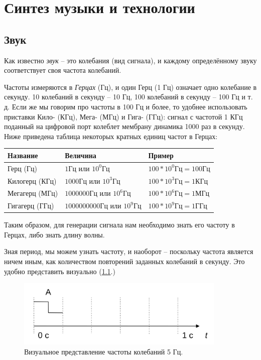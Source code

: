 \documentclass[a4paper,twoside]{book}
\begin{document}
\chapter{Синтез музыки и технологии}

\section{Звук}

Как известно \emph{звук} -- это колебания (вид сигнала), и каждому определённому
звуку соответствует своя частота колебаний.

Частоты измеряются в \emph{Герцах} (Гц), и один Герц (1 Гц) означает одно
колебание в секунду. 10 колебаний в секунду -- 10 Гц, 100 колебаний в секунду --
100 Гц и т. д. Если же мы говорим про частоты в 100 Гц и более, то удобнее
использовать приставки Кило- (КГц), Мега- (МГц) и Гига- (ГГц): сигнал с частотой
1 КГц поданный на цифровой порт колеблет мембрану динамика 1000 раз в секунду.
Ниже приведена таблица некоторых кратных единиц частот в Герцах:

\begin{tabular}{p{3cm}|p{4cm}|p{3.5cm}}
  Название & Величина & Пример \\
  \hline \hline
  Герц (Гц)
  & $ 1 \mbox{Гц} $ или $ 10^0 \mbox{Гц} $
  & $ 100 * 10^0 \mbox{Гц} = 100 \mbox{Гц} $ \\
  \hline
  Килогерц (КГц)
  & $ 1000 \mbox{Гц} $ или $ 10^3 \mbox{Гц} $
  & $ 100 * 10^3 \mbox{Гц} = 1 \mbox{КГц} $ \\
  \hline
  Мегагерц (МГц)
  & $ 1000000 \mbox{Гц} $ или $ 10^6 \mbox{Гц} $
  & $ 100 * 10^6 \mbox{Гц} = 1 \mbox{МГц} $ \\
  \hline
  Гигагерц (ГГц)
  & $ 1000000000 \mbox{Гц} $ или $ 10^9 \mbox{Гц} $
  & $ 100 * 10^9 \mbox{Гц} = 1 \mbox{ГГц} $ \\
\end{tabular}

Таким образом, для генерации сигнала нам необходимо знать его частоту в Герцах,
либо знать длину волны.

Зная период, мы можем узнать частоту, и наоборот -- поскольку частота является
ничем иным, как количеством повторений заданных колебаний в секунду. Это удобно
представить визуально (\ref{fig:sound-fig-1}.)

\begin{figure}[h]
  \caption{Визуальное представление частоты колебаний 5 Гц.}
  \label{fig:sound-fig-1}
  \includegraphics[width=10cm]{sound-fig-1}
  \centering
\end{figure}
\end{document}
